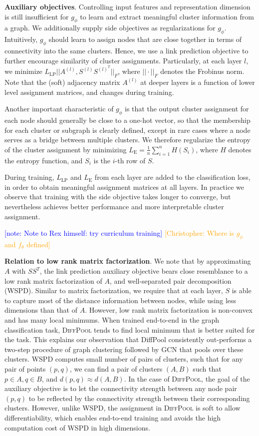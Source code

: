 \documentclass{article}
\newcommand{\note}[1]{{{\textcolor{blue}{[note: #1]}}}}
\newcommand{\chris}[1]{{{\textcolor{orange}{[Christopher: #1]}}}}
\newcommand{\xhdr}[1]{{\noindent\bfseries #1}.}
\newcommand{\name}{\textsc{DiffPool}\xspace}
\begin{document}
{\xhdr{Auxiliary objectives}
Controlling input features and representation dimension is still insufficient for $g_\phi$ to learn and extract meaningful cluster information from a graph. We additionally supply side objectives as regularizations for $g_\phi$. 
Intuitively, $g_\phi$ should learn to assign nodes that are close together in terms of connectivity into the same clusters. 
Hence, we use a link prediction objective to further encourage similarity of cluster assignments.
Particularly, at each layer $l$, we minimize
$L_{\text{LP}} ||A^{(l)}, S^{(l)} S^{{(l)}^T}||_F$, where $||\cdot||_F$ denotes the Frobinus norm. 
Note that the (soft) adjacency matrix $A^{(l)}$ at deeper layers is a function of lower level assignment matrices, and changes during training. 

Another important characteristic of $g_\phi$ is that the output cluster assignment for each node should generally be close to a one-hot vector, so that the membership for each cluster or subgraph is clearly defined, except in rare cases where a node serves as a bridge between multiple clusters. We therefore regularize the entropy of the cluster assignment by minimizing $L_{\text{E}} = \frac{1}{n} \sum_{i=1}^n H(S_i)$, where $H$ denotes the entropy function, and $S_i$ is the $i$-th row of $S$.

During training, $L_{\text{LP}}$ and $L_{\text{E}}$ from each layer are added to the classification loss, in order to obtain meaningful assignment matrices at all layers. In practice we observe that training with the side objective takes longer to converge, but nevertheless achieves better performance and more interpretable cluster assignment.

\note{Note to Rex himself: try curriculum training}
\chris{Where is $g_\phi$ and $f_\theta$ defined}

\xhdr{Relation to low rank matrix factorization}
We note that by approximating $A$ with $S S^T$, the link prediction auxiliary objective bears close resemblance to a low rank matrix factorization of $A$, and well-separated pair decomposition (WSPD). 
Similar to matrix factorization, we require that at each layer, $S$ is able to capture most of the distance information between nodes, while using less dimensions than that of $A$. However, low rank matrix factorization is non-convex and has many local minimums. When trained end-to-end in the graph classification task, \name tends to find local minimum that is better suited for the task. This explains our observation that DiffPool consistently out-performs a two-step procedure of graph clustering followed by GCN that pools over these clusters.
$\mathrm{WSPD}$ computes small number of pairs of clusters, such that for any pair of points $(p, q)$, we can find a pair of clusters $(A, B)$ such that $p\in A, q\in B$, and $d(p, q) \approx d(A, B)$. In the case of \name, the goal of the auxiliary objective is to let the connectivity strength between any node pair $(p, q)$ to be reflected by the connectivity strength between their corresponding clusters. However, unlike WSPD, the assignment in \name is soft to allow differentiability, which enables end-to-end training and avoids the high computation cost of WSPD in high dimensions.


}
\end{document}
